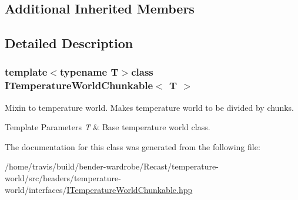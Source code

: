 \subsection*{Additional Inherited Members}


\subsection{Detailed Description}
\subsubsection*{template$<$typename T$>$class I\-Temperature\-World\-Chunkable$<$ T $>$}

Mixin to temperature world. Makes temperature world to be divided by chunks.


\begin{DoxyTemplParams}{Template Parameters}
{\em T} & Base temperature world class. \\
\hline
\end{DoxyTemplParams}


The documentation for this class was generated from the following file\-:\begin{DoxyCompactItemize}
\item 
/home/travis/build/bender-\/wardrobe/\-Recast/temperature-\/world/src/headers/temperature-\/world/interfaces/\hyperlink{_i_temperature_world_chunkable_8hpp}{I\-Temperature\-World\-Chunkable.\-hpp}\end{DoxyCompactItemize}
